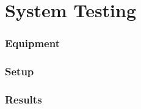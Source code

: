\section{System Testing}
 
\subsubsection{Equipment}

\subsubsection{Setup}

\subsubsection{Results}